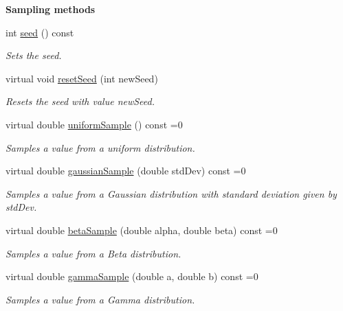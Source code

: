 \begin{Indent}{\bf Sampling methods}\par
\begin{DoxyCompactItemize}
\item 
int \hyperlink{class_q_u_e_s_o_1_1_rng_base_a3094da86084e56faaae9325f1117f9a3}{seed} () const 
\begin{DoxyCompactList}\small\item\em Sets the seed. \end{DoxyCompactList}\item 
virtual void \hyperlink{class_q_u_e_s_o_1_1_rng_base_a8cb8cbf14298bfcb84de1b562c069e84}{reset\-Seed} (int new\-Seed)
\begin{DoxyCompactList}\small\item\em Resets the seed with value {\ttfamily new\-Seed}. \end{DoxyCompactList}\item 
virtual double \hyperlink{class_q_u_e_s_o_1_1_rng_base_aed8342f0c8a4ac0a311cce9cac2b67e5}{uniform\-Sample} () const =0
\begin{DoxyCompactList}\small\item\em Samples a value from a uniform distribution. \end{DoxyCompactList}\item 
virtual double \hyperlink{class_q_u_e_s_o_1_1_rng_base_a7be9cf40cc50b973ed8c2f594f402584}{gaussian\-Sample} (double std\-Dev) const =0
\begin{DoxyCompactList}\small\item\em Samples a value from a Gaussian distribution with standard deviation given by {\ttfamily std\-Dev}. \end{DoxyCompactList}\item 
virtual double \hyperlink{class_q_u_e_s_o_1_1_rng_base_a098089a93e29db4ad9ac106c8b5de583}{beta\-Sample} (double alpha, double beta) const =0
\begin{DoxyCompactList}\small\item\em Samples a value from a Beta distribution. \end{DoxyCompactList}\item 
virtual double \hyperlink{class_q_u_e_s_o_1_1_rng_base_abd9abcf42426b568d4f13f5c3f3dc997}{gamma\-Sample} (double a, double b) const =0
\begin{DoxyCompactList}\small\item\em Samples a value from a Gamma distribution. \end{DoxyCompactList}\end{DoxyCompactItemize}
\end{Indent}

